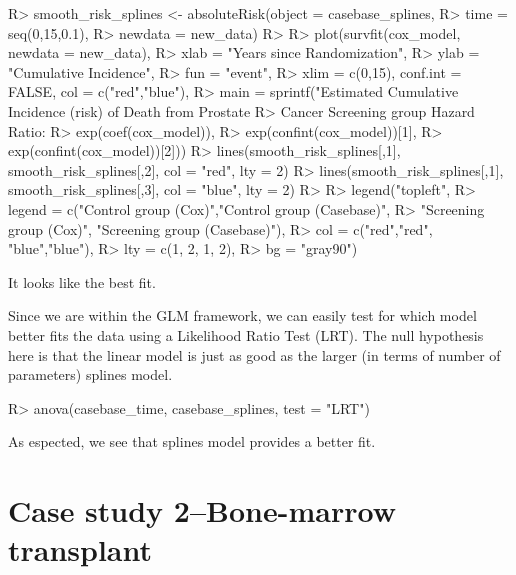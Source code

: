 \documentclass[
]{jss}
\begin{document}
\begin{CodeChunk}

\begin{CodeInput}
R> smooth_risk_splines <- absoluteRisk(object = casebase_splines, 
R>                                     time = seq(0,15,0.1), 
R>                                     newdata = new_data)
R> 
R> plot(survfit(cox_model, newdata = new_data),
R>      xlab = "Years since Randomization", 
R>      ylab = "Cumulative Incidence", 
R>      fun = "event",
R>      xlim = c(0,15), conf.int = FALSE, col = c("red","blue"), 
R>      main = sprintf("Estimated Cumulative Incidence (risk) of Death from Prostate 
R>                     Cancer Screening group Hazard Ratio: %
R>                     exp(coef(cox_model)), 
R>                     exp(confint(cox_model))[1], 
R>                     exp(confint(cox_model))[2]))
R> lines(smooth_risk_splines[,1], smooth_risk_splines[,2], col = "red", lty = 2)
R> lines(smooth_risk_splines[,1], smooth_risk_splines[,3], col = "blue", lty = 2)
R> 
R> legend("topleft", 
R>        legend = c("Control group (Cox)","Control group (Casebase)",
R>                   "Screening group (Cox)", "Screening group (Casebase)"), 
R>        col = c("red","red", "blue","blue"),
R>        lty = c(1, 2, 1, 2), 
R>        bg = "gray90")
\end{CodeInput}
\end{CodeChunk}

It looks like the best fit.

Since we are within the GLM framework, we can easily test for which
model better fits the data using a Likelihood Ratio Test (LRT). The null
hypothesis here is that the linear model is just as good as the larger
(in terms of number of parameters) splines model.

\begin{CodeChunk}

\begin{CodeInput}
R> anova(casebase_time, casebase_splines, test = "LRT")
\end{CodeInput}
\end{CodeChunk}

As espected, we see that splines model provides a better fit.

\hypertarget{case-study-2bone-marrow-transplant}{%
\section{Case study 2--Bone-marrow
transplant}\label{case-study-2bone-marrow-transplant}}
\end{document}
